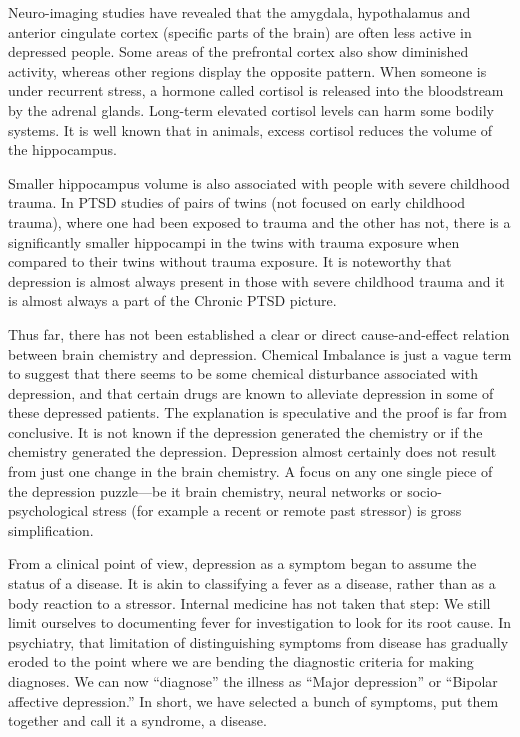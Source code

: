 \documentclass[]{book}
\begin{document}
Neuro-imaging studies have revealed that the amygdala, hypothalamus and anterior cingulate cortex (specific parts of the brain) are often less active in depressed people. Some areas of the prefrontal cortex also show diminished activity, whereas other regions display the opposite pattern. When someone is under recurrent stress, a hormone called cortisol is released into the bloodstream by the adrenal glands. Long-term elevated cortisol levels can harm some bodily systems. It is well known that in animals, excess cortisol reduces the volume of the hippocampus.

Smaller hippocampus volume is also associated with people with severe childhood trauma. In PTSD studies of pairs of twins (not focused on early childhood trauma), where one had been exposed to trauma and the other has not, there is a significantly smaller hippocampi in the twins with trauma exposure when compared to their twins without trauma exposure. It is noteworthy that depression is almost always present in those with severe childhood trauma and it is almost always a part of the Chronic PTSD picture.

Thus far, there has not been established a clear or direct cause-and-effect relation between brain chemistry and depression. Chemical Imbalance is just a vague term to suggest that there seems to be some chemical disturbance associated with depression, and that certain drugs are known to alleviate depression in some of these depressed patients. The explanation is speculative and the proof is far from conclusive. It is not known if the depression generated the chemistry or if the chemistry generated the depression. Depression almost certainly does not result from just one change in the brain chemistry. A focus on any one single piece of the depression puzzle---be it brain chemistry, neural networks or socio-psychological stress (for example a recent or remote past stressor) is gross simplification.

From a clinical point of view, depression as a symptom began to assume the status of a disease. It is akin to classifying a fever as a disease, rather than as a body reaction to a stressor. Internal medicine has not taken that step: We still limit ourselves to documenting fever for investigation to look for its root cause. In psychiatry, that limitation of distinguishing symptoms from disease has gradually eroded to the point where we are bending the diagnostic criteria for making diagnoses. We can now ``diagnose'' the illness as ``Major depression'' or ``Bipolar affective depression.'' In short, we have selected a bunch of symptoms, put them together and call it a syndrome, a disease.
\end{document}
